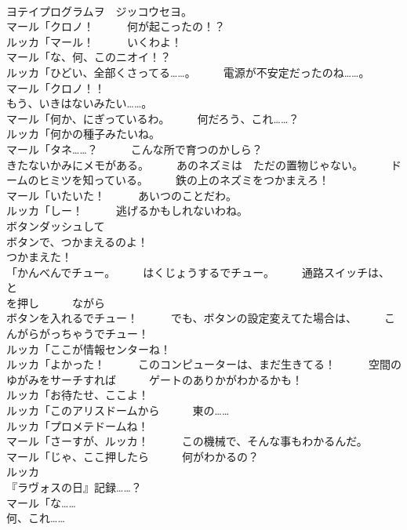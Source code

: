 \documentclass[8pt]{extreport}
\begin{document}
\begin{CJK}{UTF8}{min}
\\	ヨテイプログラムヲ　ジッコウセヨ。	
\\	マール「クロノ！　　　何が起こったの！？	
\\	ルッカ「マール！　　　いくわよ！	
\\	マール「な、何、このニオイ！？	
\\	ルッカ「ひどい、全部くさってる……。　　　電源が不安定だったのね……。	
\\	マール「クロノ！！	
\\	もう、いきはないみたい……。	
\\	マール「何か、にぎっているわ。　　　何だろう、これ……？	
\\	ルッカ「何かの種子みたいね。	
\\	マール「タネ……？　　　こんな所で育つのかしら？	
\\	きたないかみにメモがある。　　　あのネズミは　ただの置物じゃない。　　　ドームのヒミツを知っている。　　　鉄の上のネズミをつかまえろ！	
\\	マール「いたいた！　　　あいつのことだわ。	
\\	ルッカ「しー！　　　逃げるかもしれないわね。　　　
\\	ボタンダッシュして　　　
\\	ボタンで、つかまえるのよ！	
\\	つかまえた！	
\\	「かんべんでチュー。　　　はくじょうするでチュー。　　　通路スイッチは、
\\	と
\\	を押し　　　ながら
\\	ボタンを入れるでチュー！　　　でも、ボタンの設定変えてた場合は、　　　こんがらがっちゃうでチュー！	
\\	ルッカ「ここが情報センターね！	
\\	ルッカ「よかった！　　　このコンピューターは、まだ生きてる！　　　空間のゆがみをサーチすれば　　　ゲートのありかがわかるかも！	
\\	ルッカ「お待たせ、ここよ！	
\\	ルッカ「このアリスドームから　　　東の……	
\\	ルッカ「プロメテドームね！	
\\	マール「さーすが、ルッカ！　　　この機械で、そんな事もわかるんだ。	
\\	マール「じゃ、ここ押したら　　　何がわかるの？	
\\	ルッカ
\\	『ラヴォスの日』記録……？	
\\	マール「な……	
\\	何、これ……	

\end{CJK}
\end{document}
